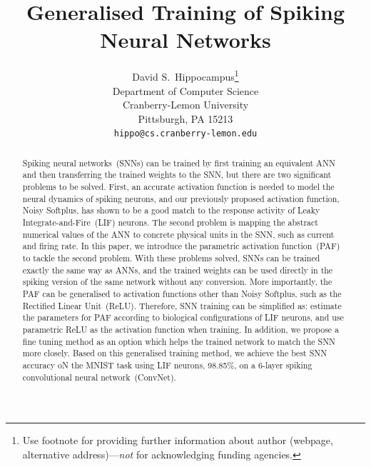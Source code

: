\documentclass{article}
\title{Generalised Training of Spiking Neural Networks}
\author{
  David S.~Hippocampus\thanks{Use footnote for providing further
    information about author (webpage, alternative
    address)---\emph{not} for acknowledging funding agencies.} \\
  Department of Computer Science\\
  Cranberry-Lemon University\\
  Pittsburgh, PA 15213 \\
  \texttt{hippo@cs.cranberry-lemon.edu} \\
}
\begin{document}

\maketitle

\begin{abstract}
	Spiking neural networks~(SNNs) can be trained by first training an equivalent ANN and then transferring the trained weights to the SNN, but there are two significant problems to be solved.
	First, an accurate activation function is needed to model the neural dynamics of spiking neurons, and our previously proposed activation function, Noisy Softplus, has shown to be a good match to the response activity of Leaky Integrate-and-Fire~(LIF) neurons.
	The second problem is mapping the abstract numerical values of the ANN to concrete physical units in the SNN, such as current and firing rate.
	In this paper, we introduce the parametric activation function~(PAF) to tackle the second problem.
    With these problems solved, SNNs can be trained exactly the same way as ANNs, and the trained weights can be used directly in the spiking version of the same network without any conversion.
    More importantly, the PAF can be generalised to activation functions other than Noisy Softplus, such as the Rectified Linear Unit~(ReLU).%
    Therefore, SNN training can be simplified as: estimate the parameters for PAF according to biological configurations of LIF neurons, and use parametric ReLU as the activation function when training.
    In addition, we propose a fine tuning method as an option which helps the trained network to match the SNN more closely.
    Based on this generalised training method, we achieve the best SNN accuracy oN the MNIST task using LIF neurons, 98.85\%, on a 6-layer spiking convolutional neural network~(ConvNet).
    


 
\end{abstract}
\end{document}

